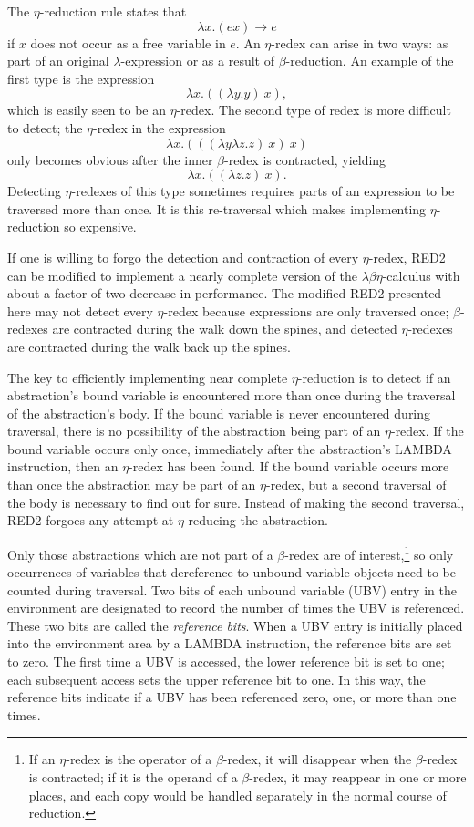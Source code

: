 The \(\eta\)-reduction rule states that
\[
\lambda x.(e x)\longrightarrow e
\]
if \(x\) does not occur as a free variable in \(e\). An \(\eta\)-redex can arise
in two ways: as part of an original \(\lambda\)-expression or as a result of
\(\beta\)-reduction. An example of the first type is the expression
\[
\lambda x.((\lambda y.y)\ x),
\]
which is easily seen to be an \(\eta\)-redex. The second type of redex is more
difficult to detect; the \(\eta\)-redex in the expression
\[
\lambda x.(((\lambda y\lambda z.z)\ x)\ x)
\]
only becomes obvious after the inner \(\beta\)-redex is contracted, yielding
\[
\lambda x.((\lambda z.z)\ x).
\]
Detecting \(\eta\)-redexes of this type sometimes requires parts of an
expression to be traversed more than once. It is this re-traversal which makes
implementing \(\eta\)-reduction so expensive.

If one is willing to forgo the detection and contraction of every
\(\eta\)-redex, RED2 can be modified to implement a nearly complete version of
the \(\lambda\beta\eta\)-calculus with about a factor of two decrease in
performance. The modified RED2 presented here may not detect every
\(\eta\)-redex because expressions are only traversed once; \(\beta\)-redexes
are contracted during the walk down the spines, and detected \(\eta\)-redexes
are contracted during the walk back up the spines.

The key to efficiently implementing near complete \(\eta\)-reduction is to
detect if an abstraction's bound variable is encountered more than once during
the traversal of the abstraction's body. If the bound variable is never
encountered during traversal, there is no possibility of the abstraction being
part of an \(\eta\)-redex. If the bound variable occurs only once, immediately
after the abstraction's LAMBDA instruction, then an \(\eta\)-redex has been
found. If the bound variable occurs more than once the abstraction may be part
of an \(\eta\)-redex, but a second traversal of the body is necessary to find
out for sure. Instead of making the second traversal, RED2 forgoes any attempt
at \(\eta\)-reducing the abstraction.

Only those abstractions which are not part of a \(\beta\)-redex are of
interest,\footnote{If an \(\eta\)-redex is the operator of a \(\beta\)-redex, it
will disappear when the \(\beta\)-redex is contracted; if it is the operand of a
\(\beta\)-redex, it may reappear in one or more places, and each copy would be
handled separately in the normal course of reduction.} so only occurrences of
variables that dereference to unbound variable objects need to be counted during
traversal. Two bits of each unbound variable (UBV) entry in the environment are
designated to record the number of times the UBV is referenced. These two bits
are called the \emph{reference bits}. When a UBV entry is initially placed into the
environment area by a LAMBDA instruction, the reference bits are set to zero.
The first time a UBV is accessed, the lower reference bit is set to one; each
subsequent access sets the upper reference bit to one. In this way, the
reference bits indicate if a UBV has been referenced zero, one, or more than one
times.

